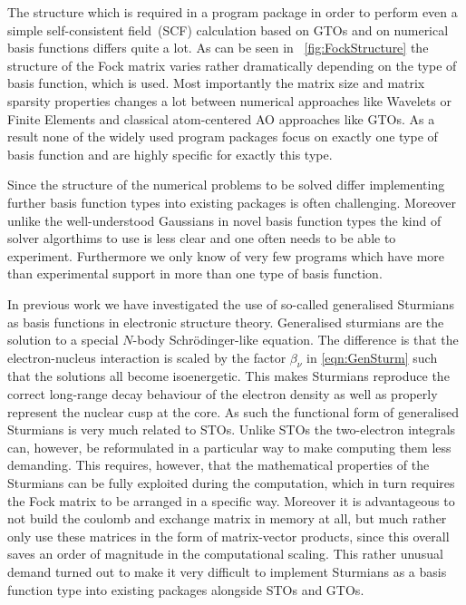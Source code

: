 The structure which is required in a program package in order to perform even a simple
self-consistent field~(SCF) calculation
based on GTOs and on numerical basis functions differs quite a lot.
As can be seen in \fig~\ref{fig:FockStructure} the structure of the Fock matrix
varies rather dramatically depending on the type of basis function,
which is used.
Most importantly the matrix size and matrix sparsity properties
changes a lot between numerical approaches like
Wavelets or Finite Elements and classical atom-centered AO approaches like GTOs.
As a result none of the widely used program packages
focus on exactly one type of basis function and are highly specific for exactly this type.

Since the structure of the numerical problems to be solved differ
implementing further basis function types into existing packages
is often challenging.
Moreover unlike the well-understood Gaussians in novel basis function types
the kind of solver algorthims to use is less clear and one often needs to be able to experiment.
Furthermore we only know of very few programs which have more than experimental
support in more than one type of basis function.


In previous work we have investigated the use of so-called generalised Sturmians as basis functions
in electronic structure theory.
Generalised sturmians are the solution to a special $N$-body Schrödinger-like
equation.
The difference is that the electron-nucleus interaction is scaled by the factor
$\beta_\nu$ in \eqref{eqn:GenSturm}
such that the solutions all become isoenergetic.
This makes Sturmians reproduce the correct long-range decay behaviour of the electron density
as well as properly represent the nuclear cusp at the core.
As such the functional form of generalised Sturmians is very much related to STOs.
Unlike STOs the two-electron integrals can, however, be reformulated in a particular way
to make computing them less demanding.
This requires, however, that the mathematical properties of the Sturmians
can be fully exploited during the computation,
which in turn requires the Fock matrix to be arranged in a specific way.
Moreover it is advantageous to not build the coulomb and exchange matrix in memory at all,
but much rather only use these matrices in the form of matrix-vector products,
since this overall saves an order of magnitude in the computational scaling.
%
%
This rather unusual demand turned out to make it very difficult to implement Sturmians
as a basis function type into existing packages alongside STOs and GTOs.

